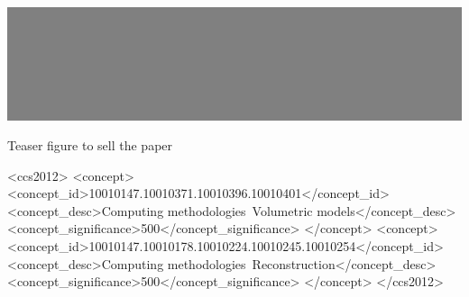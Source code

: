 \documentclass[sigconf]{acmart}
\begin{document}
\begin{teaserfigure}
    \includegraphics[width=\textwidth]{imgs/teaser.png}
    \caption{Teaser figure to sell the paper}
    \label{fig:teaser}
\end{teaserfigure}

\begin{CCSXML}
    <ccs2012>
        <concept>
            <concept_id>10010147.10010371.10010396.10010401</concept_id>
            <concept_desc>Computing methodologies~Volumetric models</concept_desc>
            <concept_significance>500</concept_significance>
        </concept>
        <concept>
            <concept_id>10010147.10010178.10010224.10010245.10010254</concept_id>
            <concept_desc>Computing methodologies~Reconstruction</concept_desc>
            <concept_significance>500</concept_significance>
        </concept>
    </ccs2012>
\end{CCSXML}



\maketitle


\end{document}
